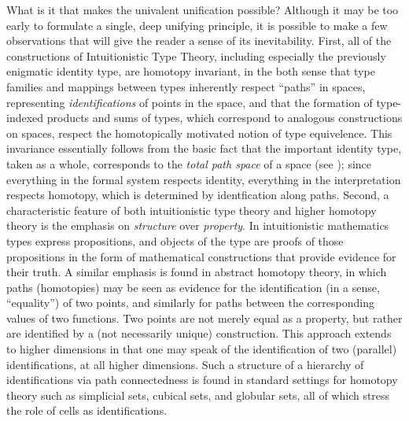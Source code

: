 \documentclass[11pt]{article}
\theoremstyle{remark}
\theoremstyle{definition}
\begin{document}
What is it that makes the univalent unification possible?  Although it may be too early to formulate a single, deep
unifying principle, it is possible to make a few observations that will give the reader a sense of its inevitability.
First, all of the constructions of Intuitionistic Type Theory, including especially the previously enigmatic identity
type, are homotopy invariant, in the both sense that type families and mappings between types inherently respect
``paths'' in spaces, representing \emph{identifications} of points in the space, and that the formation of type-indexed
products and sums of types, which correspond to analogous constructions on spaces, respect the homotopically motivated
notion of type equivelence.  This invariance essentially follows from the basic fact that the important identity type,
taken as a whole, corresponds to the \emph{total path space} of a space (see \cite{AW}); since everything in the formal
system respects identity, everything in the interpretation respects homotopy, which is determined by identfication along
paths.  Second, a characteristic feature of both intuitionistic type theory and higher homotopy theory is the emphasis
on \emph{structure} over \emph{property}.  In intuitionistic mathematics types express propositions, and objects of the
type are proofs of those propositions in the form of mathematical constructions that provide evidence for their truth.
A similar emphasis is found in abstract homotopy theory, in which paths (homotopies) may be seen as evidence for the
identification (in a sense, ``equality'') of two points, and similarly for paths between the corresponding values of two
functions.  Two points are not merely equal as a property, but rather are identified by a (not necessarily unique)
construction.  This approach extends to higher dimensions in that one may speak of the identification of two (parallel)
identifications, at all higher dimensions.  Such a structure of a hierarchy of identifications via path connectedness is
found in standard settings for homotopy theory such as simplicial sets, cubical sets, and globular sets, all of which
stress the role of cells as identifications.
\end{document}
